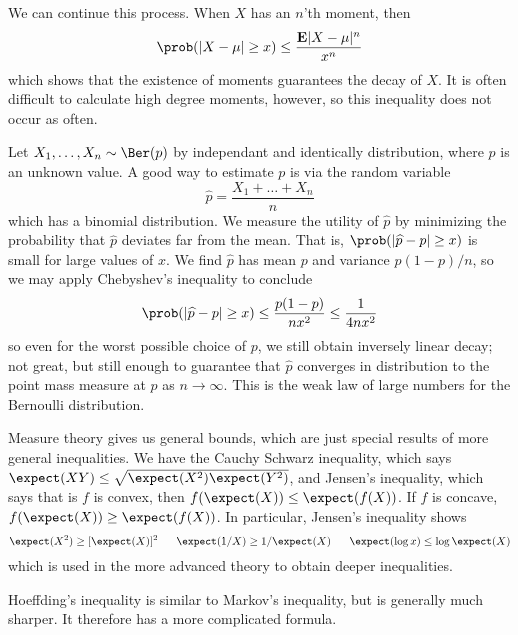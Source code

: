 We can continue this process. When $X$ has an $n$'th moment, then
%
\[ \prob(|X - \mu| \geq x) \leq \frac{\mathbf{E}|X - \mu|^n}{x^n} \]
%
which shows that the existence of moments guarantees the decay of $X$. It is often difficult to calculate high degree moments, however, so this inequality does not occur as often.

\begin{example}
    Let $X_1, \dots, X_n \sim \Ber(p)$ by independant and identically distribution, where $p$ is an unknown value. A good way to estimate $p$ is via the random variable
    \[ \widehat{p} = \frac{X_1 + \dots + X_n}{n} \]
    which has a binomial distribution. We measure the utility of $\widehat{p}$ by minimizing the probability that $\widehat{p}$ deviates far from the mean. That is, $\prob(|\widehat{p} - p| \geq x)$ is small for large values of $x$. We find $\widehat{p}$ has mean $p$ and variance $p(1-p)/n$, so we may apply Chebyshev's inequality to conclude
    \[ \prob(|\widehat{p} - p| \geq x) \leq \frac{p(1-p)}{nx^2} \leq \frac{1}{4nx^2} \]
    so even for the worst possible choice of $p$, we still obtain inversely linear decay; not great, but still enough to guarantee that $\widehat{p}$ converges in distribution to the point mass measure at $p$ as $n \to \infty$. This is the weak law of large numbers for the Bernoulli distribution.
\end{example}

Measure theory gives us general bounds, which are just special results of more general inequalities. We have the Cauchy Schwarz inequality, which says $\expect(XY) \leq \sqrt{\expect(X^2) \expect(Y^2)}$, and Jensen's inequality, which says that is $f$ is convex, then $f(\expect(X)) \leq \expect(f(X))$. If $f$ is concave, $f(\expect(X)) \geq \expect(f(X))$. In particular, Jensen's inequality shows
%
\[ \expect(X^2) \geq [\expect(X)]^2\ \ \ \ \ \expect(1/X) \geq 1/\expect(X)\ \ \ \ \ \expect(\log x) \leq \log \expect(X) \]
%
which is used in the more advanced theory to obtain deeper inequalities.

Hoeffding's inequality is similar to Markov's inequality, but is generally much sharper. It therefore has a more complicated formula.

